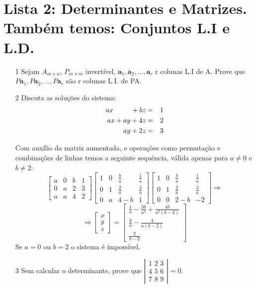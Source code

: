 \documentclass[a4paper]{article}
\begin{document}
\section*{Lista 2: Determinantes e Matrizes. Também temos: Conjuntos L.I e L.D.}

\begin{itemize}
\item[1] Sejam $A_{m \times n}$, $P_{m \times m}$ invertível, $\textbf{a}_1, \textbf{a}_2, ..., \textbf{a}_r$ r colunas L.I de A. Prove que $P\textbf{a}_1,P\textbf{a}_2,...,P\textbf{a}_r$ são r colunas L.I. de PA.

\item[2] Discuta as soluções do sistema:
\begin{eqnarray*} 
ax \hspace{9mm} +bz &=&1\\
ax+ay+4z&=&2\\
ay+2z&=&3 
\end{eqnarray*}

\textcolor[rgb]{0,0,1}{Com auxílio da matriz aumentada, e operações como permutação e combinações de linhas temos a seguinte sequência, válida apenas para $a\neq0$ e $b\neq2$:
$$
\begin{bmatrix}
a&0&b&1\\0&a&2&3\\a&a&4&2
\end{bmatrix}
\begin{bmatrix}
1&0&\frac{b}{a}&\frac{1}{a}\\0&1&\frac{2}{a}&\frac{3}{a}\\0&a&4-b&1
\end{bmatrix}
\begin{bmatrix}
1&0&\frac{b}{a}&\frac{1}{a}\\0&1&\frac{2}{a}&\frac{3}{a}\\0&0&2-b&-2
\end{bmatrix}
\Rightarrow
$$
$$
\Rightarrow
\begin{bmatrix}
x\\y\\z
\end{bmatrix}
=
\begin{bmatrix}
\frac{1}{a}-\frac{3b}{a^2} + \frac{4b}{a^2(b-2)}\\\frac{3}{a}-\frac{4}{a(b-2)}\\\frac{2}{b-2}
\end{bmatrix}
$$
Se $a=0$ ou $b=2$ o sistema é impossível.}

\item[3] Sem calcular o determinante, prove que 
$ \left \vert
\begin{array}{lll}
\displaystyle \text{1 2 3} \\
\displaystyle \text{4 5 6} \\
\displaystyle \text{7 8 9}
\end{array}
\right \vert = 0.
$


\end{itemize}
\end{document}
